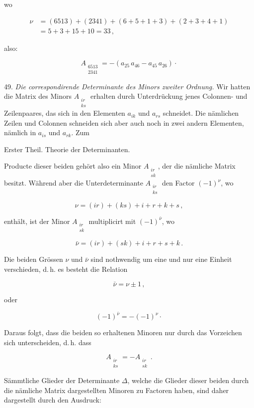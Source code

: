 \documentclass[11pt]{article}
\providecommand{\weberpage}[1]{}
\begin{document}
wo

\[
\begin{aligned}
\nu &= (6513)+(2341)+(6+5+1+3)+(2+3+4+1) \\
    &= 5+3+15+10 = 33\,,
\end{aligned}
\]

also:

\[
A_{\substack{6513\\2341}} = -\left(a_{25}\,a_{46} - a_{45}\,a_{26}\right)\cdot
\]

49. \textit{Die correspondirende Determinante des Minors zweiter Ordnung.} Wir hatten die Matrix
des Minors $A_{\substack{ir\\ks}}$ erhalten durch Unterdr\"uckung jenes Colonnen- und
Zeilenpaares, das sich in den Elementen $a_{ik}$ und $a_{rs}$ schneidet. Die n\"amlichen Zeilen
und Colonnen schneiden sich aber auch noch in zwei andern Elementen, n\"amlich in $a_{is}$ und
$a_{rk}$. Zum


\weberpage{54}
Erster Theil. Theorie der Determinanten.

Producte dieser beiden geh\"ort also ein Minor $A_{\substack{ir\\sk}}$, der die n\"amliche Matrix
besitzt. W\"ahrend aber die Unterdeterminante $A_{\substack{ir\\ks}}$ den Factor $(-1)^\nu$, wo

\[
\nu = (ir)+(ks)+i+r+k+s\,,
\]

enth\"alt, ist der Minor $A_{\substack{ir\\sk}}$ multiplicirt mit $(-1)^{\bar\nu}$, wo

\[
\bar\nu = (ir)+(sk)+i+r+s+k\,.
\]

Die beiden Gr\"ossen $\nu$ und $\bar\nu$ sind nothwendig um eine und nur eine Einheit
verschieden, d.\,h. es besteht die Relation

\[
\bar\nu = \nu \pm 1\,,
\]

oder

\[
(-1)^{\bar\nu} = -(-1)^\nu\cdot
\]

Daraus folgt, dass die beiden so erhaltenen Minoren nur durch das Vorzeichen sich unterscheiden,
d.\,h. dass

\[
A_{\substack{ir\\ks}} = -A_{\substack{ir\\sk}}\,.
\]

S\"ammtliche Glieder der Determinante $\varDelta$, welche die Glieder dieser beiden durch die
n\"amliche Matrix dargestellten Minoren zu Factoren haben, sind daher dargestellt durch den
Ausdruck:
\end{document}
